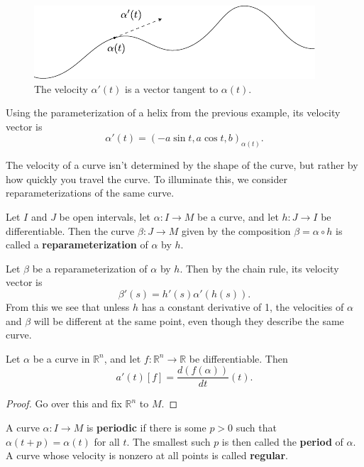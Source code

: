 \documentclass[10pt]{report}
\begin{document}
\begin{figure}[H]
	\centering
	\includegraphics[scale=1]{fig/velocity.pdf}
	\caption{The velocity $\alpha'(t)$ is a vector tangent to $\alpha(t)$.}
\end{figure}

\begin{ex}
Using the parameterization of a helix from the previous example, its velocity vector is
\[
	\alpha'(t) = (-a \sin t, a \cos t, b)_{\alpha(t)}.
\]
\end{ex}

The velocity of a curve isn't determined by the shape of the curve, but rather by how quickly you travel the curve. To illuminate this, we consider reparameterizations of the same curve.

\begin{defn}
	Let $I$ and $J$ be open intervals, let $\alpha:I\to M$ be a curve, and let $h:J\to I$ be differentiable. Then the curve $\beta:J\to M$ given by the composition $\beta = \alpha \circ h$ is called a \textbf{reparameterization} of $\alpha$ by $h$.
\end{defn}

Let $\beta$ be a reparameterization of $\alpha$ by $h$. Then by the chain rule, its velocity vector is
\[
	\beta'(s) = h'(s) \alpha'(h(s)).
\] 
From this we see that unless $h$ has a constant derivative of 1, the velocities of $\alpha$ and $\beta$ will be different at the same point, even though they describe the same curve.

\begin{prop}
Let $\alpha$ be a curve in $\mathbb{R}^n$, and let $f:\mathbb{R}^n\to \mathbb{R}$ be differentiable. Then
\[
	a'(t)[f] = \frac{d (f(\alpha))}{d t} (t).
\] 
\end{prop}
\begin{proof}
	{\color{red}Go over this and fix $\mathbb{R}^n$ to $M$.}
\end{proof}

A curve $\alpha:I\to M$ is \textbf{periodic} if there is some $p>0$ such that $\alpha(t+p) = \alpha(t)$ for all $t$. The smallest such $p$ is then called the \textbf{period} of $\alpha$. A curve whose velocity is nonzero at all points is called \textbf{regular}.
\end{document}
